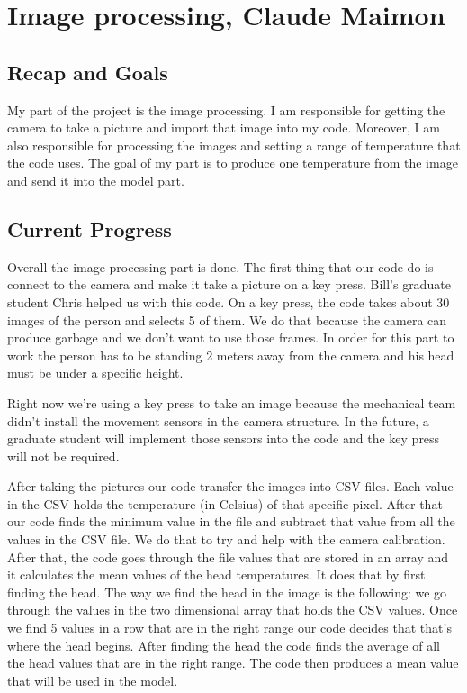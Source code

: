 \documentclass[onecolumn, draftclsnofoot,10pt, compsoc]{IEEEtran}
\begin{document}
\section{Image processing, Claude Maimon}

\subsection{Recap and Goals}
My part of the project is the image processing. I am responsible for getting the camera to take a picture and import that image into my code. Moreover, I am also responsible for processing the images and setting a range of temperature that the code uses. The goal of my part is to produce one temperature from the image and send it into the model part. 



\subsection{Current Progress}
Overall the image processing part is done. The first thing that our code do is connect to the camera and make it take a picture on a key press. Bill’s graduate student Chris helped us with this code. On a key press, the code takes about 30 images of the person and selects 5 of them. We do that because the camera can produce garbage and we don’t want to use those frames. In order for this part to work the person has to be standing 2 meters away from the camera and his head must be under a specific height. 

Right now we’re using a key press to take an image because the mechanical team didn’t install the movement sensors in the camera structure. In the future, a graduate student will implement those sensors into the code and the key press will not be required. 

After taking the pictures our code transfer the images into CSV files. Each value in the CSV holds the temperature (in Celsius) of that specific pixel. After that our code finds the minimum value in the file and subtract that value from all the values in the CSV file. We do that to try and help with the camera calibration. After that, the code goes through the file values that are stored in an array and it calculates the mean values of the head temperatures. It does that by first finding the head. The way we find the head in the image is the following: we go through the values in the two dimensional array that holds the CSV values. Once we find 5 values in a row that are in the right range our code decides that that’s where the head begins. After finding the head the code finds the average of all the head values that are in the right range. The code then produces a mean value that will be used in the model. 
\end{document}
